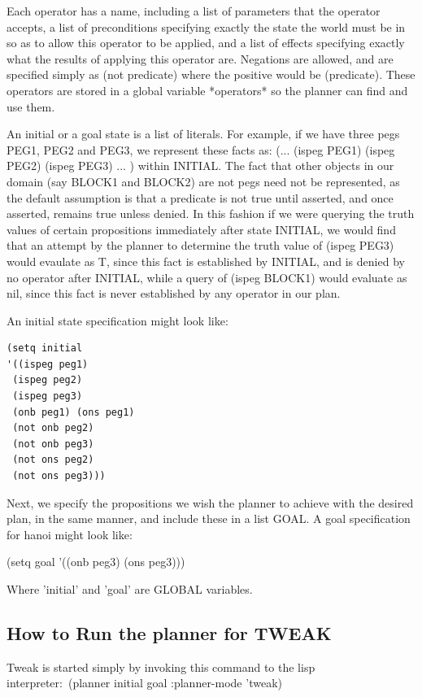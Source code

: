 Each operator has a name, including a list of parameters that the operator
accepts, a list of preconditions specifying exactly the state the world must be in so as to allow this operator to be applied, and a list of effects
specifying exactly what the results of applying this operator are.  Negations
are allowed, and are specified simply as (not predicate) where the positive
would be (predicate). These operators are stored in a global variable 
*operators* so the planner can find and use them.

An initial or a goal state is a list of literals.
For example,
if we have three pegs PEG1, PEG2 and PEG3, we represent these facts as:
(... (ispeg PEG1) (ispeg PEG2) (ispeg PEG3) ... ) within INITIAL.  The fact 
that other objects in our domain (say BLOCK1 and BLOCK2) are not pegs need
not be represented, as the default assumption is that a predicate is not true
until asserted, and once asserted, remains true unless denied.  In this 
fashion if we were querying the truth values of certain propositions 
immediately after state INITIAL, we would find that an attempt by the 
planner to  determine the truth value of (ispeg PEG3)
would evaulate as T, since this fact is established by INITIAL, and is
denied by no operator after INITIAL, while a query of (ispeg BLOCK1) would 
evaluate as nil, since this fact is never established by any operator in our
plan.  

An initial state specification might look like:

\begin{verbatim}
(setq initial 
'((ispeg peg1) 
 (ispeg peg2) 
 (ispeg peg3)
 (onb peg1) (ons peg1) 
 (not onb peg2)
 (not onb peg3)
 (not ons peg2)
 (not ons peg3)))
\end{verbatim}

Next, we specify the propositions we wish the planner to achieve with the
desired plan, in the same manner, and include these in a list GOAL.
A goal specification for hanoi might look like:

(setq goal '((onb peg3) (ons peg3)))

Where 'initial' and 'goal' are GLOBAL variables.

\subsection{How to Run the planner for TWEAK }

Tweak is started simply by invoking this command to the lisp interpreter:\ 
(planner initial goal :planner-mode 'tweak)

